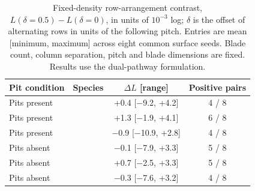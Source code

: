 \begin{table}[htbp]\centering\small
\caption{Fixed-density row-arrangement contrast, $L(\delta=0.5)-L(\delta=0)$, in units of $10^{-3}$ log; $\delta$ is the offset of alternating rows in units of the following pitch. Entries are mean [minimum, maximum] across eight common surface seeds. Blade count, column separation, pitch and blade dimensions are fixed. Results use the dual-pathway formulation.}
\label{tab:geomphase}
\begin{tabular}{llcc}\toprule
Pit condition & Species & $\Delta L$ [range] & Positive pairs\\\midrule
Pits present & \Ec{} & +0.4 [\ensuremath{-}9.2, +4.2] & 4 / 8\\
Pits present & \Sa{} & +1.3 [\ensuremath{-}1.9, +4.1] & 6 / 8\\
Pits present & \Pa{} & \ensuremath{-}0.9 [\ensuremath{-}10.9, +2.8] & 4 / 8\\
Pits absent & \Ec{} & \ensuremath{-}0.1 [\ensuremath{-}7.9, +3.3] & 5 / 8\\
Pits absent & \Sa{} & +0.7 [\ensuremath{-}2.5, +3.3] & 5 / 8\\
Pits absent & \Pa{} & \ensuremath{-}0.3 [\ensuremath{-}7.6, +3.2] & 4 / 8\\
\bottomrule\end{tabular}
\end{table}

